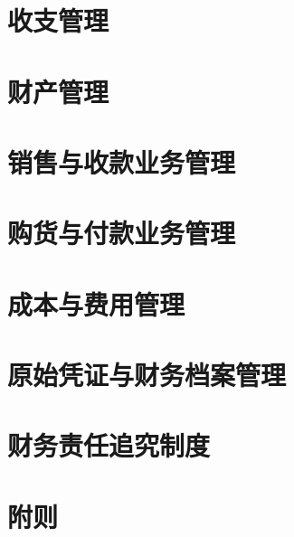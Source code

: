 \documentclass{ctexart}
\begin{document}
\section{收支管理}
\label{sec-3}

\section{财产管理}
\label{sec-4}

\section{销售与收款业务管理}
\label{sec-5}

\section{购货与付款业务管理}
\label{sec-6}

\section{成本与费用管理}
\label{sec-7}

\section{原始凭证与财务档案管理}
\label{sec-8}

\section{财务责任追究制度}
\label{sec-9}

\section{附则}
\label{sec-10}
\end{document}
